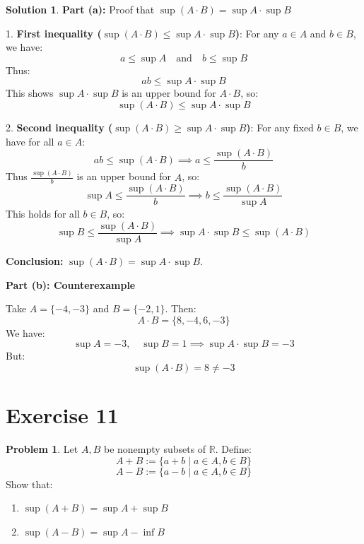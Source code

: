 \documentclass{article}
\theoremstyle{definition}
\newtheorem{problem}{Problem}
\newtheorem*{solution}{Solution}
\begin{document}
\begin{solution}

\textbf{Part (a):} Proof that \(\sup(A \cdot B) = \sup A \cdot \sup B\)

1. \textbf{First inequality (\(\sup(A \cdot B) \leq \sup A \cdot \sup B\))}:
For any \(a \in A\) and \(b \in B\), we have:
\[
a \leq \sup A \quad \text{and} \quad b \leq \sup B
\]
Thus:
\[
ab \leq \sup A \cdot \sup B
\]
This shows \(\sup A \cdot \sup B\) is an upper bound for \(A \cdot B\), so:
\[
\sup(A \cdot B) \leq \sup A \cdot \sup B
\]

2. \textbf{Second inequality (\(\sup(A \cdot B) \geq \sup A \cdot \sup B\))}:
For any fixed \(b \in B\), we have for all \(a \in A\):
\[
ab \leq \sup(A \cdot B) \implies a \leq \frac{\sup(A \cdot B)}{b}
\]
Thus \(\frac{\sup(A \cdot B)}{b}\) is an upper bound for \(A\), so:
\[
\sup A \leq \frac{\sup(A \cdot B)}{b} \implies b \leq \frac{\sup(A \cdot B)}{\sup A}
\]
This holds for all \(b \in B\), so:
\[
\sup B \leq \frac{\sup(A \cdot B)}{\sup A} \implies \sup A \cdot \sup B \leq \sup(A \cdot B)
\]

\textbf{Conclusion:} \(\sup(A \cdot B) = \sup A \cdot \sup B\).

\textbf{Part (b): Counterexample}

Take \(A = \{-4, -3\}\) and \(B = \{-2, 1\}\). Then:
\[
A \cdot B = \{8, -4, 6, -3\}
\]
We have:
\[
\sup A = -3, \quad \sup B = 1 \implies \sup A \cdot \sup B = -3
\]
But:
\[
\sup(A \cdot B) = 8 \neq -3
\]
\end{solution}


\section*{Exercise 11}

\begin{problem}
Let \( A, B \) be nonempty subsets of \( \mathbb{R} \). Define:
\[
A + B := \{a + b \mid a \in A, b \in B\}
\]
\[
A - B := \{a - b \mid a \in A, b \in B\}
\]
Show that:
\begin{enumerate}[label=(\alph*)]
    \item \(\sup(A + B) = \sup A + \sup B\)
    \item \(\sup(A - B) = \sup A - \inf B\)
\end{enumerate}
\end{problem}
\end{document}
